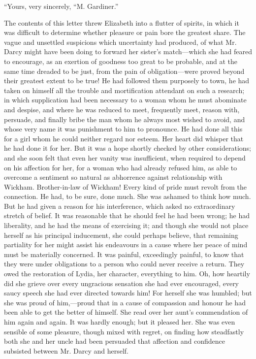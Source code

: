 \documentclass[12pt,openright]{book}
\begin{document}
“Yours, very sincerely,
“M. Gardiner.”


The contents of this letter threw Elizabeth into a flutter of spirits, in which it was difficult to determine whether pleasure or pain bore the greatest share. The vague and unsettled suspicions which uncertainty had produced, of what Mr. Darcy might have been doing to forward her sister’s match—which she had feared to encourage, as an exertion of goodness too great to be probable, and at the same time dreaded to be just, from the pain of obligation—were proved beyond their greatest extent to be true! He had followed them purposely to town, he had taken on himself all the trouble and mortification attendant on such a research; in which supplication had been necessary to a woman whom he must abominate and despise, and where he was reduced to meet, frequently meet, reason with, persuade, and finally bribe the man whom he always most wished to avoid, and whose very name it was punishment to him to pronounce. He had done all this for a girl whom he could neither regard nor esteem. Her heart did whisper that he had done it for her. But it was a hope shortly checked by other considerations; and she soon felt that even her vanity was insufficient, when required to depend on his affection for her, for a woman who had already refused him, as able to overcome a sentiment so natural as abhorrence against relationship with Wickham. Brother-in-law of Wickham! Every kind of pride must revolt from the connection. He had, to be sure, done much. She was ashamed to think how much. But he had given a reason for his interference, which asked no extraordinary stretch of belief. It was reasonable that he should feel he had been wrong; he had liberality, and he had the means of exercising it; and though she would not place herself as his principal inducement, she could perhaps believe, that remaining partiality for her might assist his endeavours in a cause where her peace of mind must be materially concerned. It was painful, exceedingly painful, to know that they were under obligations to a person who could never receive a return. They owed the restoration of Lydia, her character, everything to him. Oh, how heartily did she grieve over every ungracious sensation she had ever encouraged, every saucy speech she had ever directed towards him! For herself she was humbled; but she was proud of him,—proud that in a cause of compassion and honour he had been able to get the better of himself. She read over her aunt’s commendation of him again and again. It was hardly enough; but it pleased her. She was even sensible of some pleasure, though mixed with regret, on finding how steadfastly both she and her uncle had been persuaded that affection and confidence subsisted between Mr. Darcy and herself.
\end{document}
